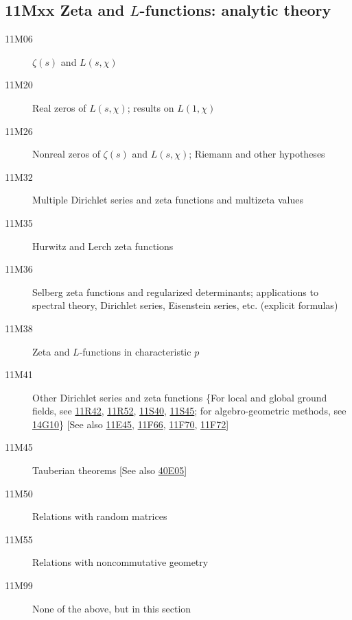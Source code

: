 \subsection*{11Mxx  Zeta and $L$-functions: analytic theory }\label{11Mxx}
\begin{description}  
\item [11M06]\label{11M06} $\zeta (s)$ and $L(s, \chi)$
\item [11M20]\label{11M20} Real zeros of $L(s, \chi)$; results on $L(1, \chi)$
\item [11M26]\label{11M26} Nonreal zeros of $\zeta (s)$ and $L(s, \chi)$; Riemann and other hypotheses
\item [11M32]\label{11M32} Multiple Dirichlet series and zeta functions and multizeta values
\item [11M35]\label{11M35} Hurwitz and Lerch zeta functions
\item [11M36]\label{11M36} Selberg zeta functions and regularized determinants; applications to spectral theory, Dirichlet series, Eisenstein series, etc. (explicit formulas)
\item [11M38]\label{11M38} Zeta and $L$-functions in characteristic $p$
\item [11M41]\label{11M41} Other Dirichlet series and zeta functions \{For local and global ground fields, see \hyperref[11R42]{11R42}, \hyperref[11R52]{11R52}, \hyperref[11S40]{11S40}, \hyperref[11S45]{11S45}; for algebro-geometric methods, see \hyperref[14G10]{14G10}\} [See also \hyperref[11E45]{11E45}, \hyperref[11F66]{11F66}, \hyperref[11F70]{11F70}, \hyperref[11F72]{11F72}]
\item [11M45]\label{11M45} Tauberian theorems [See also \hyperref[40E05]{40E05}]
\item [11M50]\label{11M50} Relations with random matrices
\item [11M55]\label{11M55} Relations with noncommutative geometry
\item [11M99]\label{11M99} None of the above, but in this section

\end{description}
